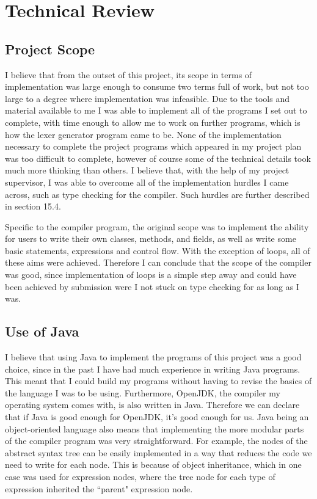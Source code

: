 \documentclass[a4paper, 11pt]{article}
\begin{document}
\newpage\section{Technical Review}

\subsection{Project Scope}
I believe that from the outset of this project, its scope in terms of implementation was large enough to consume two terms full of work, but not too large to a degree where implementation was infeasible. Due to the tools and material available to me I was able to implement all of the programs I set out to complete, with time enough to allow me to work on further programs, which is how the lexer generator program came to be. None of the implementation necessary to complete the project programs which appeared in my project plan was too difficult to complete, however of course some of the technical details took much more thinking than others. I believe that, with the help of my project supervisor, I was able to overcome all of the implementation hurdles I came across, such as type checking for the compiler. Such hurdles are further described in section 15.4.

Specific to the compiler program, the original scope was to implement the ability for users to write their own classes, methods, and fields, as well as write some basic statements, expressions and control flow. With the exception of loops, all of these aims were achieved. Therefore I can conclude that the scope of the compiler was good, since implementation of loops is a simple step away and could have been achieved by submission were I not stuck on type checking for as long as I was.

\subsection{Use of Java}
I believe that using Java to implement the programs of this project was a good choice, since in the past I have had much experience in writing Java programs. This meant that I could build my programs without having to revise the basics of the language I was to be using. Furthermore, OpenJDK\cite{OpenJDK}, the compiler my operating system comes with, is also written in Java. Therefore we can declare that if Java is good enough for OpenJDK, it's good enough for us. Java being an object-oriented language also means that implementing the more modular parts of the compiler program was very straightforward. For example, the nodes of the abstract syntax tree can be easily implemented in a way that reduces the code we need to write for each node. This is because of object inheritance, which in one case was used for expression nodes, where the tree node for each type of expression inherited the ``parent" expression node.
\end{document}
